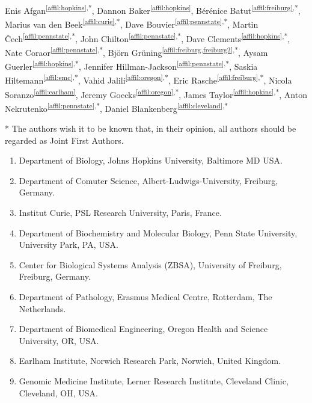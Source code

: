 \setcounter{NAT@ctr}{-1}

{}


Enis Afgan\textsuperscript{\ref{affil:hopkins},*},
Dannon Baker\textsuperscript{\ref{affil:hopkins}},
Bérénice Batut\textsuperscript{\ref{affil:freiburg},*},
Marius van den Beek\textsuperscript{\ref{affil:curie},*},
Dave Bouvier\textsuperscript{\ref{affil:pennstate},*},
Martin Čech\textsuperscript{\ref{affil:pennstate},*},
John Chilton\textsuperscript{\ref{affil:pennstate},*},
Dave Clements\textsuperscript{\ref{affil:hopkins},*},
Nate Coraor\textsuperscript{\ref{affil:pennstate},*},
Björn Grüning\textsuperscript{\ref{affil:freiburg,freiburg2},*},
Aysam Guerler\textsuperscript{\ref{affil:hopkins},*},
Jennifer Hillman-Jackson\textsuperscript{\ref{affil:pennstate},*},
Saskia Hiltemann\textsuperscript{\ref{affil:emc},*},
Vahid Jalili\textsuperscript{\ref{affil:oregon},*},
Eric Rasche\textsuperscript{\ref{affil:freiburg},*},
Nicola Soranzo\textsuperscript{\ref{affil:earlham}},
Jeremy Goecks\textsuperscript{\ref{affil:oregon},*},
James Taylor\textsuperscript{\ref{affil:hopkins},*},
Anton Nekrutenko\textsuperscript{\ref{affil:pennstate},*},
Daniel Blankenberg\textsuperscript{\ref{affil:cleveland},*}

* The authors wish it to be known that, in their opinion, all authors should be regarded as Joint First Authors.

\small
\begin{enumerate}
\itemsep-0.5em
\item Department of Biology, Johns Hopkins University, Baltimore MD USA. \label{affil:hopkins}
\item Department of Comuter Science, Albert-Ludwigs-University, Freiburg, Germany. \label{affil:freiburg}
\item Institut Curie, PSL Research University, Paris, France. \label{affil:curie}
\item Department of Biochemistry and Molecular Biology, Penn State University, University Park, PA, USA. \label{affil:pennstate}
\item Center for Biological Systems Analysis (ZBSA), University of Freiburg, Freiburg, Germany. \label{affil:freiburg2}
\item Department of Pathology, Erasmus Medical Centre, Rotterdam, The Netherlands. \label{affil:emc}
\item Department of Biomedical Engineering, Oregon Health and Science University, OR, USA.\label{affil:oregon}
\item Earlham Institute, Norwich Research Park, Norwich, United Kingdom. \label{affil:earlham}
\item Genomic Medicine Institute, Lerner Research Institute, Cleveland Clinic, Cleveland, OH, USA. \label{affil:cleveland}
\end{enumerate}
\normalsize

